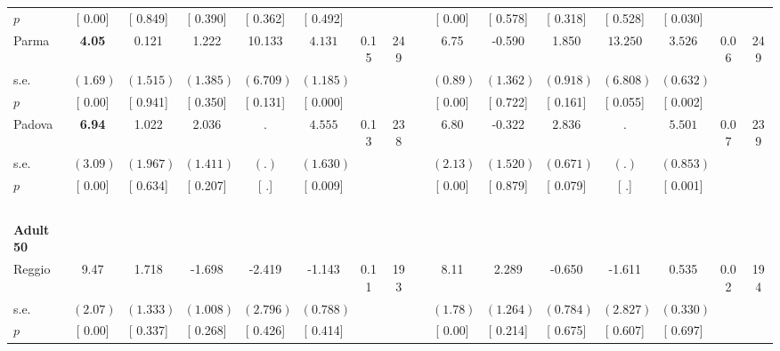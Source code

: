 \begin{longtable}{L{8em} c c c c c c c p{1em} c c c c c c c}
\quad \quad \quad \quad $ p$ & [     0.00] & [    0.849] & [    0.390] & [    0.362] & [    0.492] & & & & [     0.00] & [    0.578] & [    0.318] & [    0.528] & [    0.030] & &  \\[1em]
\quad \quad \quad Parma& \textbf{     4.05} &     0.121 &     1.222 &    10.133 & $ \mathbf{    4.131}$ &      0.15 &       249 & & 6.75 &    -0.590 &     1.850 & $ \mathbf{   13.250}$ & $ \mathbf{    3.526}$ &      0.06 &       249  \\*
\quad \quad \quad \quad s.e.& $ (     1.69)$ & $ (    1.515)$ & $ (    1.385)$ & $ (    6.709)$ & $ (    1.185)$ & & & & $ (     0.89)$ & $ (    1.362)$ & $ (    0.918)$ & $ (    6.808)$ & $ (    0.632)$ & &  \\*
\quad \quad \quad \quad $ p$ & [     0.00] & [    0.941] & [    0.350] & [    0.131] & [    0.000] & & & & [     0.00] & [    0.722] & [    0.161] & [    0.055] & [    0.002] & &  \\[1em]
\quad \quad \quad Padova& \textbf{     6.94} &     1.022 &     2.036 &         . & $ \mathbf{    4.555}$ &      0.13 &       238 & & 6.80 &    -0.322 & $ \mathbf{    2.836}$ &         . & $ \mathbf{    5.501}$ &      0.07 &       239  \\*
\quad \quad \quad \quad s.e.& $ (     3.09)$ & $ (    1.967)$ & $ (    1.411)$ & $ (        .)$ & $ (    1.630)$ & & & & $ (     2.13)$ & $ (    1.520)$ & $ (    0.671)$ & $ (        .)$ & $ (    0.853)$ & &  \\*
\quad \quad \quad \quad $ p$ & [     0.00] & [    0.634] & [    0.207] & [        .] & [    0.009] & & & & [     0.00] & [    0.879] & [    0.079] & [        .] & [    0.001] & &  \\[1em]
~\\[1em]
\quad \quad \textbf{Adult 50} & & & & & & & & & & & & & & & \\* 
\quad \quad \quad Reggio& 9.47 &     1.718 &    -1.698 &    -2.419 &    -1.143 &      0.11 &       193 & & 8.11 &     2.289 &    -0.650 &    -1.611 &     0.535 &      0.02 &       194  \\*
\quad \quad \quad \quad s.e.& $ (     2.07)$ & $ (    1.333)$ & $ (    1.008)$ & $ (    2.796)$ & $ (    0.788)$ & & & & $ (     1.78)$ & $ (    1.264)$ & $ (    0.784)$ & $ (    2.827)$ & $ (    0.330)$ & &  \\*
\quad \quad \quad \quad $ p$ & [     0.00] & [    0.337] & [    0.268] & [    0.426] & [    0.414] & & & & [     0.00] & [    0.214] & [    0.675] & [    0.607] & [    0.697] & &  \\[1em]

\end{longtable}
